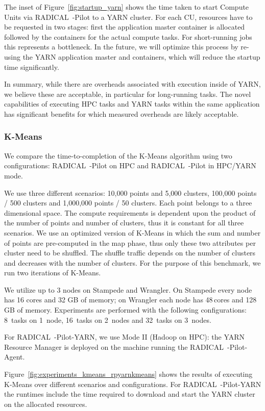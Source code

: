 The inset of Figure~\ref{fig:startup_yarn} shows the time taken to start Compute Units via RADICAL~-Pilot to a YARN cluster.
For each CU, resources have to be requested in two stages: first the application master container is allocated followed by the containers for the actual compute tasks.
For short-running jobs this represents a bottleneck.
In the future, we will optimize this process by re-using the YARN application master and containers, which will reduce the startup time significantly.

In summary, while there are overheads associated with execution inside of YARN, we believe these are acceptable, in particular for long-running tasks.
The novel capabilities of executing HPC tasks and YARN tasks within the same application has significant benefits for which measured overheads are likely acceptable.

\subsubsection{K-Means}

We compare the time-to-completion of the K-Means algorithm using two configurations: RADICAL~-Pilot on HPC and RADICAL~-Pilot in HPC/YARN mode. 

We use three different scenarios: 10,000 points and 5,000 clusters, 100,000 points / 500 clusters and 1,000,000 points / 50 clusters.
Each point belongs to a three dimensional space.
The compute requirements is dependent upon the product of the number of points and number of clusters, thus it is constant for all three scenarios.
We use an optimized version of K-Means in which the sum and number of points are pre-computed in the map phase, thus only these two attributes per cluster need to be shuffled.
The shuffle traffic depends on the number of clusters and decreases with the number of clusters.
For the purpose of this benchmark, we run two iterations of K-Means.

We utilize up to 3 nodes on Stampede and Wrangler.
On Stampede every node has 16 cores and 32 GB of memory; on Wrangler each node has 48\,cores and 128\,GB of memory.
Experiments are performed with the following configurations: 8~tasks on 1~node, 16~tasks on 2~nodes and 32~tasks on 3~nodes.

For RADICAL~-Pilot-YARN, we use Mode II (Hadoop on HPC): the YARN Resource Manager is deployed on the machine running the RADICAL~-Pilot-Agent.

Figure~\ref{fig:experiments_kmeans_rpyarnkmeans} shows the results of executing K-Means over different scenarios and configurations.
For RADICAL~-Pilot-YARN the runtimes include the time required to download and start the YARN cluster on the allocated resources.


